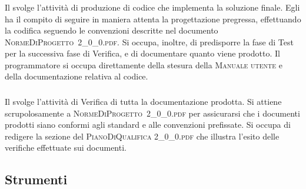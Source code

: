 		\subsubsection{\Progr}
		Il \textit{\Progr} svolge l'attività di produzione di codice che implementa la soluzione finale. Egli ha il compito di seguire in maniera attenta la progettazione pregressa, effettuando la codifica seguendo le convenzioni descritte nel documento \hbox{\textsc{NormeDiProgetto 2\_0\_0.pdf}}. Si occupa, inoltre, di predisporre la fase di Test per la successiva fase di Verifica, e di documentare quanto viene prodotto.
		Il programmatore si occupa direttamente della stesura della \textsc{Manuale utente } e della documentazione relativa al codice.
		
		\subsubsection{\Ver}
		Il \textit{\Ver} svolge l'attività di Verifica di tutta la documentazione prodotta. Si attiene scrupolosamente a \hbox{\textsc{NormeDiProgetto 2\_0\_0.pdf}} per assicurarsi che i documenti prodotti siano conformi agli standard e alle convenzioni prefissate. Si occupa di redigere la sezione del \textsc{PianoDiQualifica 2\_0\_0.pdf} che illustra l'esito delle verifiche effettuate sui documenti.

	\subsection{Strumenti}

